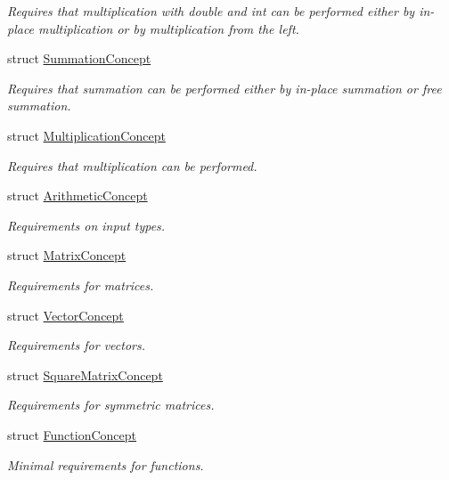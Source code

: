 \begin{DoxyCompactItemize}
\begin{DoxyCompactList}\small\item\em Requires that multiplication with double and int can be performed either by in-\/place multiplication or by multiplication from the left. \end{DoxyCompactList}\item 
struct \hyperlink{structfuncy_1_1Concepts_1_1SummationConcept}{Summation\-Concept}
\begin{DoxyCompactList}\small\item\em Requires that summation can be performed either by in-\/place summation or free summation. \end{DoxyCompactList}\item 
struct \hyperlink{structfuncy_1_1Concepts_1_1MultiplicationConcept}{Multiplication\-Concept}
\begin{DoxyCompactList}\small\item\em Requires that multiplication can be performed. \end{DoxyCompactList}\item 
struct \hyperlink{structfuncy_1_1Concepts_1_1ArithmeticConcept}{Arithmetic\-Concept}
\begin{DoxyCompactList}\small\item\em Requirements on input types. \end{DoxyCompactList}\item 
struct \hyperlink{structfuncy_1_1Concepts_1_1MatrixConcept}{Matrix\-Concept}
\begin{DoxyCompactList}\small\item\em Requirements for matrices. \end{DoxyCompactList}\item 
struct \hyperlink{structfuncy_1_1Concepts_1_1VectorConcept}{Vector\-Concept}
\begin{DoxyCompactList}\small\item\em Requirements for vectors. \end{DoxyCompactList}\item 
struct \hyperlink{structfuncy_1_1Concepts_1_1SquareMatrixConcept}{Square\-Matrix\-Concept}
\begin{DoxyCompactList}\small\item\em Requirements for symmetric matrices. \end{DoxyCompactList}\item 
struct \hyperlink{structfuncy_1_1Concepts_1_1FunctionConcept}{Function\-Concept}
\begin{DoxyCompactList}\small\item\em Minimal requirements for functions. \end{DoxyCompactList}\end{DoxyCompactItemize}
